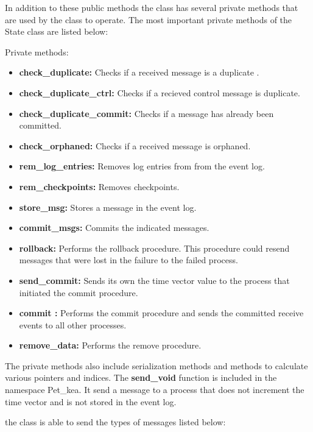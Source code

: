 \documentclass[twocolumn, a4paper,11pt]{article}%
\begin{document}
\par In addition to these public methods the class has several private methods that are used by the class to operate. The most important private methods of the State class are listed below:
\par Private methods:
\begin{itemize}
	\item \textbf{check\_duplicate:}
	Checks if a received message is a duplicate .
	\item \textbf{check\_duplicate\_ctrl:}
	Checks if a recieved control message is duplicate.
	\item \textbf{check\_duplicate\_commit:}
	Checks if a message has already been committed.
	\item \textbf{check\_orphaned:}
	Checks if a received message is orphaned.
	\item \textbf{rem\_log\_entries:}
	Removes log entries from from the event log.
	\item \textbf{rem\_checkpoints:}
	Removes checkpoints.
	\item \textbf{store\_msg:}
	Stores a message in the event log.
	\item \textbf{commit\_msgs:}
	Commits the indicated messages.
	\item \textbf{rollback:}
	Performs the rollback procedure. This procedure could resend messages that were lost in the failure to the failed process.
	\item \textbf{send\_commit:}
	Sends its own the time vector value to the process that initiated the commit procedure.
	\item \textbf{commit :}
	Performs the commit procedure and sends the committed receive events to all other processes.
	\item \textbf{remove\_data:}
	Performs the remove procedure.
\end{itemize} 
The private methods also include serialization methods and methods to calculate various pointers and indices. 
The \textbf{send\_void} function is included in the  namespace Pet\_kea. It send a message to a process that does not increment the time vector and is not stored in the event log.
\par the class is able to send the types of messages listed below:
\end{document}
